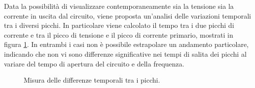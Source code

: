 Data la possibilità di visualizzare contemporaneamente sia la tensione sia la corrente in uscita dal circuito, viene proposta un'analisi delle variazioni temporali tra i diversi picchi. In particolare viene calcolato il tempo tra i due picchi di corrente e tra il picco di tensione e il picco di corrente primario, mostrati in figura \ref{fig:tempi}.
In entrambi i casi non è possibile estrapolare un andamento particolare, indicando che non vi sono differenze significative nei tempi di salita dei picchi al variare del tempo di apertura del circuito e della frequenza.

\begin{figure}
\centering
{}
\caption{Misura delle differenze temporali tra i picchi.}
\label{fig:tempi}
\end{figure}


\label{ch:discussione}
